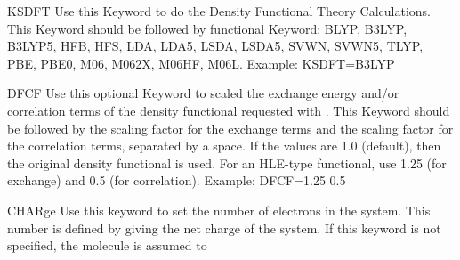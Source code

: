 \begin{keywordlist}
\item[KSDFT]
Use this Keyword to do the Density Functional Theory Calculations.
This Keyword should be followed by functional Keyword:
BLYP, B3LYP, B3LYP5, HFB, HFS, LDA, LDA5, LSDA, LSDA5, SVWN, SVWN5, TLYP, PBE, PBE0, M06, M062X, M06HF, M06L.
Example: KSDFT=B3LYP
\item[DFCF]
  Use this optional Keyword to scaled the exchange energy and/or correlation terms of the density functional requested with .
This Keyword should be followed by the scaling factor for the exchange terms and the scaling factor for the correlation terms, separated by a space.
If the values are 1.0 (default), then the original density functional is used.
For an HLE-type functional, use 1.25 (for exchange) and 0.5 (for correlation).
Example: DFCF=1.25 0.5
\item[CHARge]
Use this keyword to set the number of electrons in the system.
This number is defined by giving the net charge of the system.
If this keyword is not specified, the molecule is assumed to

\end{keywordlist}
